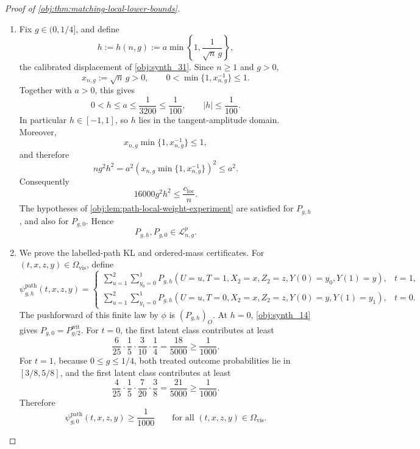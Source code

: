 \begin{proof}[Proof of \cref{obj:thm:matching-local-lower-bounds}]
\begin{enumerate}
\item Fix \(g\in(0,1/4]\), and define
\[
h:=h(n,g):=a\min\left\{1,\frac1{\sqrt n\,g}\right\},
\]
the calibrated displacement of \cref{obj:synth_31}.  Since \(n\ge1\) and \(g>0\),
\[
x_{n,g}:=\sqrt n\,g>0,
\qquad
0<\min\{1,x_{n,g}^{-1}\}\le1.
\]
Together with \(a>0\), this gives
\[
0<h\le a\le\frac1{3200}\le\frac1{100},
\qquad
|h|\le\frac1{100}.
\]
In particular \(h\in[-1,1]\), so \(h\) lies in the tangent-amplitude domain.  Moreover,
\[
x_{n,g}\min\{1,x_{n,g}^{-1}\}\le1,
\]
and therefore
\[
n g^2 h^2
=
a^2\left(x_{n,g}\min\{1,x_{n,g}^{-1}\}\right)^2
\le
a^2 .
\]
Consequently
\[
16000g^2h^2\le\frac{c_{\mathrm{loc}}}{n}.
\]
The hypotheses of \cref{obj:lem:path-local-weight-experiment} are satisfied for \(P_{g,h}\), and also for \(P_{g,0}\).  Hence
\[
P_{g,h},P_{g,0}\in\mathcal L_{n,g}^{p}.
\] %

\item We prove the labelled-path KL and ordered-mass certificates.  For \((t,x,z,y)\in\Omega_{\mathrm{vis}}\), define
\[
\psi^{\mathrm{path}}_{g,h}(t,x,z,y)
=
\begin{cases}
\displaystyle
\sum_{u=1}^{2}\sum_{y_0=0}^{1}
P_{g,h}(U=u,T=1,X_2=x,Z_2=z,Y(0)=y_0,Y(1)=y),
& t=1,\\[1.2em]
\displaystyle
\sum_{u=1}^{2}\sum_{y_1=0}^{1}
P_{g,h}(U=u,T=0,X_2=x,Z_2=z,Y(0)=y,Y(1)=y_1),
& t=0.
\end{cases}
\]
The pushforward of this finite law by \(\phi\) is \((P_{g,h})_O\).  At \(h=0\), \cref{obj:synth_14} gives \(P_{g,0}=P_{g/2}^{\mathrm{wit}}\).  For \(t=0\), the first latent class contributes at least
\[
\frac6{25}\cdot\frac15\cdot\frac3{10}\cdot\frac14
=
\frac{18}{5000}
\ge
\frac1{1000}.
\]
For \(t=1\), because \(0\le g\le1/4\), both treated outcome probabilities lie in \([3/8,5/8]\), and the first latent class contributes at least
\[
\frac4{25}\cdot\frac15\cdot\frac7{20}\cdot\frac38
=
\frac{21}{5000}
\ge
\frac1{1000}.
\]
Therefore
\[
\psi^{\mathrm{path}}_{g,0}(t,x,z,y)\ge\frac1{1000}
\qquad
\text{for all }(t,x,z,y)\in\Omega_{\mathrm{vis}} .
\]


\end{enumerate}
\end{proof}
